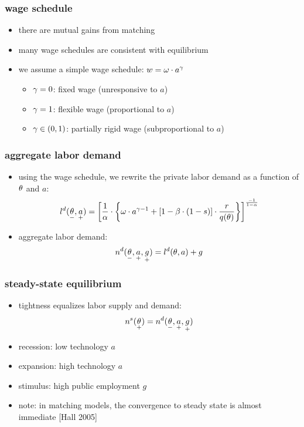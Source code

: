 \documentclass[12pt,xcolor={dvipsnames},hyperref={pdftex,pdfpagemode=UseNone,hidelinks,pdfdisplaydoctitle=true},usepdftitle=false]{beamer}
\begin{document}
\begin{frame}
\frametitle{wage schedule}
\begin{itemize}
\item there are mutual gains from matching
\item many wage schedules are consistent with equilibrium
\item we assume a simple wage schedule: $w= \omega\cdot a^{\gamma}$
\begin{itemize}
\item $\gamma=0$: fixed wage (unresponsive to $a$)
\item $\gamma=1$: flexible wage (proportional to $a$) 
\item $\gamma\in(0,1)$: partially rigid wage (subproportional to $a$)
\end{itemize}
\end{itemize}
\end{frame}


\begin{frame}
\frametitle{aggregate labor demand}
\begin{itemize}
\item using the wage schedule, we rewrite the private labor demand as a function of $\theta$ and $a$:
\begin{equation*}
l^{d}(\underset{-}{\theta},\underset{+}{a}) = \left[ \frac{1}{\alpha}\cdot \left\lbrace \omega\cdot a^{\gamma-1}+\left[ 1-\beta\cdot (1-s) \right]\cdot \frac{r}{q(\theta)} \right\rbrace \right]^{\frac{-1}{1-\alpha}}
\end{equation*}
\item aggregate labor demand:
\begin{equation*}
n^{d}(\underset{-}{\theta},\underset{+}{a},\underset{+}{g}) = l^{d}(\theta,a) + g
\end{equation*}
\end{itemize}
\end{frame}


\begin{frame}
\frametitle{steady-state equilibrium}
\begin{itemize}
\item tightness equalizes labor supply and demand:
\begin{equation*}
n^{s}(\underset{+}{\theta})= n^{d}(\underset{-}{\theta},\underset{+}{a},\underset{+}{g})
\end{equation*}
\item recession: low technology $a$
\item expansion: high technology $a$
\item stimulus: high public employment $g$
\item note: in matching models, the convergence to steady state is almost immediate [Hall 2005]
\end{itemize}
\end{frame}
\end{document}
